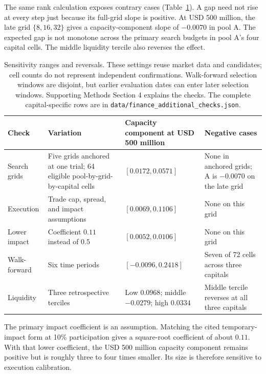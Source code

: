 \documentclass{article}
\begin{document}
The same rank calculation exposes contrary cases (Table~\ref{tab:sensitivity}). A gap need not rise at every step just because its full-grid slope is positive. At USD 500 million, the late grid $\{8,16,32\}$ gives a capacity-component slope of $-0.0070$ in pool A. The expected gap is not monotone across the primary search budgets in pool A's four capital cells. The middle liquidity tercile also reverses the effect.

\begin{table}[htbp]
\centering
\caption{Sensitivity ranges and reversals. These settings reuse market data and candidates; cell counts do not represent independent confirmations. Walk-forward selection windows are disjoint, but earlier evaluation dates can enter later selection windows. Supporting Methods Section 4 explains the checks. The complete capital-specific rows are in \mbox{\texttt{data/finance\_additional\_checks.json}}.}
\label{tab:sensitivity}
\begin{tabular}{@{}>{\raggedright\arraybackslash}p{}>{\raggedright\arraybackslash}p{}>{\raggedright\arraybackslash}p{}>{\raggedright\arraybackslash}p{}@{}}
\toprule
Check & Variation & Capacity component at USD 500 million & Negative cases\\
\midrule
Search grids & Five grids anchored at one trial; 64 eligible pool-by-grid-by-capital cells & $[0.0172,0.0571]$ & None in anchored grids; A is $-0.0070$ on the late grid\\
Execution & Trade cap, spread, and impact assumptions & $[0.0069,0.1106]$ & None on this grid\\
Lower impact & Coefficient $0.11$ instead of $0.5$ & $[0.0052,0.0106]$ & None on this grid\\
Walk-forward & Six time periods & $[-0.0096,0.2418]$ & Seven of 72 cells across three capitals\\
Liquidity & Three retrospective terciles & Low $0.0968$; middle $-0.0279$; high $0.0334$ & Middle tercile reverses at all three capitals\\
\bottomrule
\end{tabular}

\end{table}

The primary impact coefficient is an assumption. Matching the cited temporary-impact form at 10\% participation gives a square-root coefficient of about $0.11$. With that lower coefficient, the USD 500 million capacity component remains positive but is roughly three to four times smaller. Its size is therefore sensitive to execution calibration.
\end{document}
